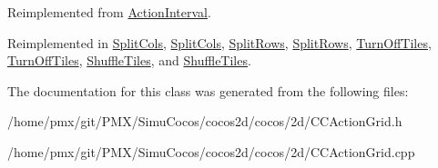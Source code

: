 Reimplemented from \hyperlink{classActionInterval_ad3d91186b2c3108488ddbbdbbd982484}{Action\+Interval}.



Reimplemented in \hyperlink{classSplitCols_ae9600d8beda7affc5d8eb29624978698}{Split\+Cols}, \hyperlink{classSplitCols_a6378035983a5b7f31ea3f3e2638a750c}{Split\+Cols}, \hyperlink{classSplitRows_a12d92df62d1f441371e4563fc3aa3196}{Split\+Rows}, \hyperlink{classSplitRows_a46357d39bbf4e251086b42e4ad9ba9a1}{Split\+Rows}, \hyperlink{classTurnOffTiles_adb571aa2b12a065bb9cd94fe2c1f9eb0}{Turn\+Off\+Tiles}, \hyperlink{classTurnOffTiles_ac06cc826e738b0fe0df40fe554a00d45}{Turn\+Off\+Tiles}, \hyperlink{classShuffleTiles_af9880bf4abd44f5b605ab1a47159e817}{Shuffle\+Tiles}, and \hyperlink{classShuffleTiles_aa5b245843f208ba8300d6eb302937163}{Shuffle\+Tiles}.



The documentation for this class was generated from the following files\+:\begin{DoxyCompactItemize}
\item 
/home/pmx/git/\+P\+M\+X/\+Simu\+Cocos/cocos2d/cocos/2d/C\+C\+Action\+Grid.\+h\item 
/home/pmx/git/\+P\+M\+X/\+Simu\+Cocos/cocos2d/cocos/2d/C\+C\+Action\+Grid.\+cpp\end{DoxyCompactItemize}
